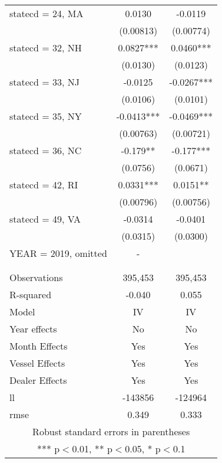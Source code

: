 \begin{tabular}{lcc}
statecd = 24, MA & 0.0130 & -0.0119 \\
 & (0.00813) & (0.00774) \\
statecd = 32, NH & 0.0827*** & 0.0460*** \\
 & (0.0130) & (0.0123) \\
statecd = 33, NJ & -0.0125 & -0.0267*** \\
 & (0.0106) & (0.0101) \\
statecd = 35, NY & -0.0413*** & -0.0469*** \\
 & (0.00763) & (0.00721) \\
statecd = 36, NC & -0.179** & -0.177*** \\
 & (0.0756) & (0.0671) \\
statecd = 42, RI & 0.0331*** & 0.0151** \\
 & (0.00796) & (0.00756) \\
statecd = 49, VA & -0.0314 & -0.0401 \\
 & (0.0315) & (0.0300) \\
YEAR = 2019, omitted & - &  \\
 &  &  \\
 &  &  \\
Observations & 395,453 & 395,453 \\
R-squared & -0.040 & 0.055 \\
Model & IV & IV \\
Year effects & No & No \\
Month Effects & Yes & Yes \\
Vessel Effects & Yes & Yes \\
Dealer Effects & Yes & Yes \\
ll & -143856 & -124964 \\
 rmse & 0.349 & 0.333 \\ \hline
\multicolumn{3}{c}{ Robust standard errors in parentheses} \\
\multicolumn{3}{c}{ *** p$<$0.01, ** p$<$0.05, * p$<$0.1} \\
\end{tabular}
